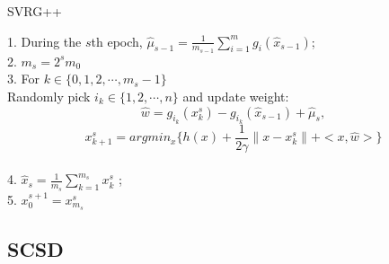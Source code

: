 \documentclass[11pt]{article} %
\begin{document}
\begin{algorithm} %
\caption{SVRG++} %
\label{SVRG++} %
1. During the $s$th epoch, $\hat{\mu}_{s-1}=\frac{1}{m_{s-1}}\sum_{i=1}^{m} g_i ({\hat{x}}_{s-1})$;\\
2. $m_s=2^s m_{0}$\\
3. For $k\in \{ 0,1, 2, \cdots, m_s -1\}$\\

 Randomly pick $i_k \in \{1,2,\cdots, n\}$ and update weight:
 $$ \hat{w}=g_{i_k}({x}_{k}^s)-g_{i_k}(\hat{x}_{s-1})+\hat{\mu}_s,$$
 $$x_{k+1}^s=argmin_{x}\{ h(x)+\frac{1}{2\gamma}\| x- x_k^s\|+<x,\hat{w}>\}$$\\

4. ${\hat x}_{s}=\frac{1}{m_s}\sum _{k=1}^{m_s}x_{k}^s$ ;\\
5. $x_0 ^{s+1}=x_{m_s}^s$
\end{algorithm}


\subsection{SCSD}
\end{document}
